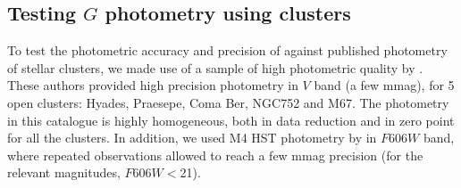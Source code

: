 


\subsection{Testing $G$ photometry using clusters}\label{sssec:cu9val_ocphot}
 
To test the photometric accuracy and precision of {} against published photometry of stellar clusters, we made use of a sample of high photometric quality by \cite{2008ApJS..176..262T}. These authors provided high precision photometry in $V$ band (a few  mmag), for 5 open clusters: Hyades, Praesepe, Coma Ber, NGC752 and M67. The photometry in this catalogue is highly homogeneous, both in data reduction and in zero point for all the clusters. In addition, we used M4 HST photometry by \cite{2014MNRAS.442.2381N} in $F606W$ band, where repeated observations allowed to reach a few mmag precision (for the relevant magnitudes, $F606W<$21).

